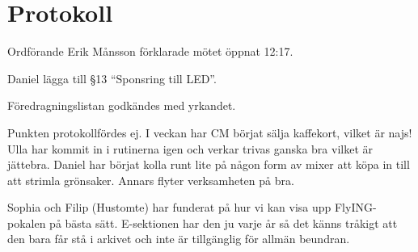 \documentclass[10pt]{article}
\def\mo{Erik Månsson}
\begin{document}
\section*{Protokoll}
\begin{paragrafer}
Ordförande {\mo} förklarade mötet öppnat 12:17.

{\valavmo}

{\valavms}

{\valavj}

{\tosg}

{\ingaadj}


Daniel \ypa lägga till \S13 ``Sponsring till LED''.

Föredragningslistan godkändes med yrkandet.



\begin{fyllnadsval} %
\end{fyllnadsval}

\begin{paragrafer}
Punkten protokollfördes ej.
I veckan har CM börjat sälja kaffekort, vilket är najs! Ulla har kommit in i rutinerna igen och verkar trivas ganska bra vilket är jättebra. Daniel har börjat kolla runt lite på någon form av mixer att köpa in till att strimla grönsaker. Annars flyter verksamheten på bra.

Sophia och Filip (Hustomte) har funderat på hur vi kan visa upp FlyING-pokalen på bästa sätt. E-sektionen har den ju varje år så det känns tråkigt att den bara får stå i arkivet och inte är tillgänglig för allmän beundran.


\end{paragrafer}
\end{paragrafer}
\end{document}
